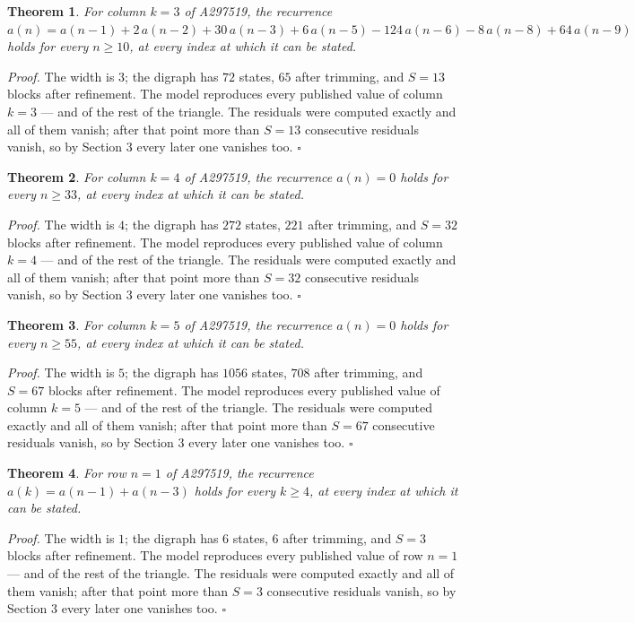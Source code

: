 \documentclass[11pt]{article}
\newtheorem{theorem}{Theorem}
\theoremstyle{definition}
\begin{document}
\begin{theorem} For column $k = 3$ of A297519, the recurrence $a(n) = a(n-1) + 2\,a(n-2) + 30\,a(n-3) + 6\,a(n-5) - 124\,a(n-6) - 8\,a(n-8) + 64\,a(n-9)$ holds for every $n \ge 10$, at every index at which it can be stated.\end{theorem}

{\itshape Proof.} The width is $3$; the digraph has $72$ states, $65$ after trimming, and $S = 13$ blocks after refinement. The model reproduces every published value of column $k = 3$ --- and of the rest of the triangle. The residuals were computed exactly and all of them vanish; after that point more than $S = 13$ consecutive residuals vanish, so by Section 3 every later one vanishes too. $\square$

\begin{theorem} For column $k = 4$ of A297519, the recurrence $a(n) = 0$ holds for every $n \ge 33$, at every index at which it can be stated.\end{theorem}

{\itshape Proof.} The width is $4$; the digraph has $272$ states, $221$ after trimming, and $S = 32$ blocks after refinement. The model reproduces every published value of column $k = 4$ --- and of the rest of the triangle. The residuals were computed exactly and all of them vanish; after that point more than $S = 32$ consecutive residuals vanish, so by Section 3 every later one vanishes too. $\square$

\begin{theorem} For column $k = 5$ of A297519, the recurrence $a(n) = 0$ holds for every $n \ge 55$, at every index at which it can be stated.\end{theorem}

{\itshape Proof.} The width is $5$; the digraph has $1056$ states, $708$ after trimming, and $S = 67$ blocks after refinement. The model reproduces every published value of column $k = 5$ --- and of the rest of the triangle. The residuals were computed exactly and all of them vanish; after that point more than $S = 67$ consecutive residuals vanish, so by Section 3 every later one vanishes too. $\square$

\begin{theorem} For row $n = 1$ of A297519, the recurrence $a(k) = a(n-1) + a(n-3)$ holds for every $k \ge 4$, at every index at which it can be stated.\end{theorem}

{\itshape Proof.} The width is $1$; the digraph has $6$ states, $6$ after trimming, and $S = 3$ blocks after refinement. The model reproduces every published value of row $n = 1$ --- and of the rest of the triangle. The residuals were computed exactly and all of them vanish; after that point more than $S = 3$ consecutive residuals vanish, so by Section 3 every later one vanishes too. $\square$
\end{document}
